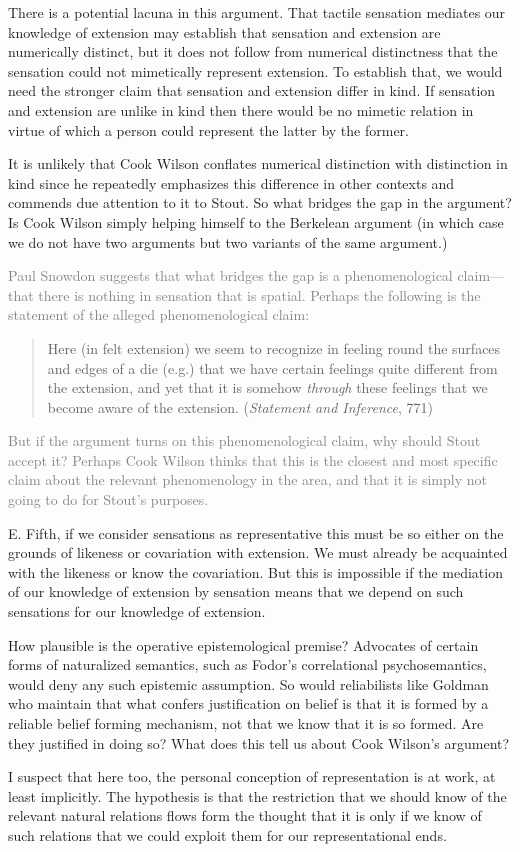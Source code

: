 \documentclass[11pt]{article}
\newcommand{\discuss}[2][gray]{\textcolor{#1}{#2}}
\begin{document}
There is a potential lacuna in this argument. That tactile sensation mediates our knowledge of extension may establish that sensation and extension are numerically distinct, but it does not follow from numerical distinctness that the sensation could not mimetically represent extension. To establish that, we would need the stronger claim that sensation and extension differ in kind. If sensation and extension are unlike in kind then there would be no mimetic relation in virtue of which a person could represent the latter by the former.

It is unlikely that Cook Wilson conflates numerical distinction with distinction in kind since he repeatedly emphasizes this difference in other contexts and commends due attention to it to Stout. So what bridges the gap in the argument? Is Cook Wilson simply helping himself to the Berkelean argument (in which case we do not have two arguments but two variants of the same argument.)

\discuss{Paul Snowdon suggests that what bridges the gap is a phenomenological claim---that there is nothing in sensation that is spatial. Perhaps the following is the statement of the alleged phenomenological claim:
\begin{quote}
	Here (in felt extension) we seem to recognize in feeling round the surfaces and edges of a die (e.g.) that we have certain feelings quite different from the extension, and yet that it is somehow \emph{through} these feelings that we become aware of the extension. (\emph{Statement and Inference}, 771)
\end{quote}
But if the argument turns on this phenomenological claim, why should Stout accept it? Perhaps Cook Wilson thinks that this is the closest and most specific claim about the relevant phenomenology in the area, and that it is simply not going to do for Stout's purposes.}

E. Fifth, if we consider sensations as representative this must be so either on the grounds of likeness or covariation with extension. We must already be acquainted with the likeness or know the covariation. But this is impossible if the mediation of our knowledge of extension by sensation means that we depend on such sensations for our knowledge of extension.

How plausible is the operative epistemological premise? Advocates of certain forms of naturalized semantics, such as Fodor's correlational psychosemantics, would deny any such epistemic assumption. So would reliabilists like Goldman who maintain that what confers justification on belief is that it is formed by a reliable belief forming mechanism, not that we know that it is so formed. Are they justified in doing so? What does this tell us about Cook Wilson's argument?

I suspect that here too, the personal conception of representation is at work, at least implicitly. The hypothesis is that the restriction that we should know of the relevant natural relations flows form the thought that it is only if we know of such relations that we could exploit them for our representational ends.

\end{document}
